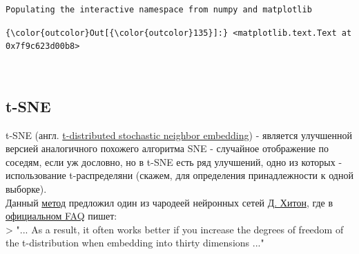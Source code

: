 \documentclass[11pt]{article}
\begin{document}
    \begin{Verbatim}[commandchars=\\\{\}]
Populating the interactive namespace from numpy and matplotlib

    \end{Verbatim}

\begin{Verbatim}[commandchars=\\\{\}]
{\color{outcolor}Out[{\color{outcolor}135}]:} <matplotlib.text.Text at 0x7f9c623d00b8>
\end{Verbatim}
            
    \begin{center}
    \end{center}
    { \hspace*{\fill} \\}
    
    \subsection{t-SNE}\label{t-sne}

    t-SNE (англ.
\href{https://en.wikipedia.org/wiki/T-distributed_stochastic_neighbor_embedding}{t-distributed
stochastic neighbor embedding}) - является улучшенной версией
аналогичного похожего алгоритма SNE - случайное отображение по соседям,
если уж дословно, но в t-SNE есть ряд улучшений, одно из которых -
использование t-распределяни (скажем, для определения принадлежности к
одной выборке).\\
Данный
\href{http://www.jmlr.org/papers/volume9/vandermaaten08a/vandermaaten08a.pdf}{метод}
предложил один из чародеей нейронных сетей
\href{https://en.wikipedia.org/wiki/Geoffrey_Hinton}{Д. Хитон}, где в
\href{https://lvdmaaten.github.io/tsne/}{официальном FAQ} пишет:\\
\textgreater{} "... As a result, it often works better if you increase
the degrees of freedom of the t-distribution when embedding into thirty
dimensions ..."
\end{document}
